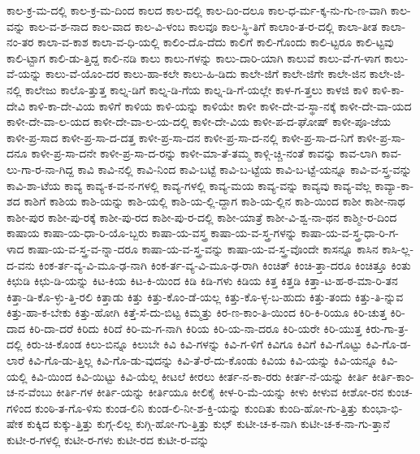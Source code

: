 {ಕಾಲ-ಕ್ರ-ಮ-ದಲ್ಲಿ
ಕಾಲ-ಕ್ರ-ಮ-ದಿಂದ
ಕಾಲದ
ಕಾಲ-ದಲ್ಲಿ
ಕಾಲ-ದಿಂ-ದಲೂ
ಕಾಲ-ಧ-ರ್ಮ-ಕ್ಕ-ನು-ಗು-ಣ-ವಾಗಿ
ಕಾಲ-ವನ್ನು
ಕಾಲ-ವ-ಶ-ನಾದ
ಕಾಲ-ವಾದ
ಕಾಲ-ವಿ-ಳಂಬ
ಕಾಲವೂ
ಕಾಲ-ಸ್ಥಿ-ತಿಗೆ
ಕಾಲಾಂ-ತ-ರ-ದಲ್ಲಿ
ಕಾಲಾ-ತೀತ
ಕಾಲಾ-ನಂ-ತರ
ಕಾಲಾ-ವ-ಕಾಶ
ಕಾಲಾ-ವ-ಧಿ-ಯಲ್ಲಿ
ಕಾಲಿಂ-ದೊ-ದೆದು
ಕಾಲಿಗೆ
ಕಾಲಿ-ಗೊಂದು
ಕಾಲಿ-ಟ್ಟರೂ
ಕಾಲಿ-ಟ್ಟವು
ಕಾಲಿ-ಟ್ಟಾಗ
ಕಾಲಿ-ಡು-ತ್ತಿದ್ದ
ಕಾಲಿ-ನಡಿ
ಕಾಲು
ಕಾಲು-ಗಳನ್ನು
ಕಾಲು-ದಾರಿ-ಯಾಗಿ
ಕಾಲುವೆ
ಕಾಲು-ವೆ-ಗ-ಳಾಗ
ಕಾಲು-ವೆ-ಯನ್ನು
ಕಾಲು-ವೆ-ಯೊಂ-ದರ
ಕಾಲು-ಹಾ-ಕಲೇ
ಕಾಲು-ಹಿ-ಡಿದು
ಕಾಲೇ-ಜಿಗೆ
ಕಾಲೇ-ಜಿಗೇ
ಕಾಲೇ-ಜಿನ
ಕಾಲೇ-ಜಿ-ನಲ್ಲಿ
ಕಾಲೇಜು
ಕಾಲೊ-ತ್ತುತ್ತ
ಕಾಲ್ನ-ಡಿಗೆ
ಕಾಲ್ನ-ಡಿ-ಗೆಯ
ಕಾಲ್ನ-ಡಿ-ಗೆ-ಯಲ್ಲೇ
ಕಾಳ-ಗ-ತ್ತಲು
ಕಾಳಜಿ
ಕಾಳಿ
ಕಾಳಿ-ಕಾ-ದೇವಿ
ಕಾಳಿ-ಕಾ-ದೇ-ವಿಯ
ಕಾಳಿಗೆ
ಕಾಳಿಯ
ಕಾಳಿ-ಯನ್ನು
ಕಾಳಿಯೇ
ಕಾಳೀ
ಕಾಳೀ-ದೇ-ವ-ಸ್ಥಾ-ನಕ್ಕೆ
ಕಾಳೀ-ದೇ-ವಾ-ಯದ
ಕಾಳೀ-ದೇ-ವಾ-ಲ-ಯದ
ಕಾಳೀ-ದೇ-ವಾ-ಲ-ಯ-ದಲ್ಲಿ
ಕಾಳೀ-ದೇ-ವಿಯ
ಕಾಳೀ-ಪ-ದ-ಘೋಷ್
ಕಾಳೀ-ಪೂ-ಜೆಯ
ಕಾಳೀ-ಪ್ರ-ಸಾದ
ಕಾಳೀ-ಪ್ರ-ಸಾ-ದ-ದತ್ತ
ಕಾಳೀ-ಪ್ರ-ಸಾ-ದನ
ಕಾಳೀ-ಪ್ರ-ಸಾ-ದ-ನಲ್ಲಿ
ಕಾಳೀ-ಪ್ರ-ಸಾ-ದ-ನಿಗೆ
ಕಾಳೀ-ಪ್ರ-ಸಾ-ದನೂ
ಕಾಳೀ-ಪ್ರ-ಸಾ-ದನೇ
ಕಾಳೀ-ಪ್ರ-ಸಾ-ದ-ರನ್ನು
ಕಾಳೀ-ಮಾ-ತೆ-ತಮ್ಮ
ಕಾಳ್ಗಿ-ಚ್ಚಿ-ನಂತೆ
ಕಾವನ್ನು
ಕಾವ-ಲಾಗಿ
ಕಾವ-ಲು-ಗಾ-ರ-ನಾ-ಗಿದ್ದ
ಕಾವಿ
ಕಾವಿ-ನಲ್ಲಿ
ಕಾವಿ-ನಿಂದ
ಕಾವಿ-ಬಟ್ಟೆ
ಕಾವಿ-ಬ-ಟ್ಟೆಯ
ಕಾವಿ-ಬ-ಟ್ಟೆ-ಯನ್ನೂ
ಕಾವಿ-ವ-ಸ್ತ್ರ-ವನ್ನು
ಕಾವಿ-ಶಾ-ಟೆಯ
ಕಾವ್ಯ
ಕಾವ್ಯ-ಕ-ವ-ನ-ಗಳಲ್ಲಿ
ಕಾವ್ಯ-ಗಳಲ್ಲಿ
ಕಾವ್ಯ-ಮಯ
ಕಾವ್ಯ-ವನ್ನು
ಕಾವ್ಯವು
ಕಾವ್ಯ-ವೆಲ್ಲ
ಕಾವ್ಯಾ-ಕಾ-ಶದ
ಕಾಶಿಗೆ
ಕಾಶಿಯ
ಕಾಶಿ-ಯನ್ನು
ಕಾಶಿ-ಯಲ್ಲಿ
ಕಾಶಿ-ಯ-ಲ್ಲಿ-ದ್ದಾಗ
ಕಾಶಿ-ಯ-ಲ್ಲಿನ
ಕಾಶಿ-ಯಿಂದ
ಕಾಶೀ
ಕಾಶೀ-ನಾಥ
ಕಾಶೀ-ಪುರ
ಕಾಶೀ-ಪು-ರಕ್ಕೆ
ಕಾಶೀ-ಪು-ರದ
ಕಾಶೀ-ಪು-ರ-ದಲ್ಲಿ
ಕಾಶೀ-ಯಾತ್ರೆ
ಕಾಶೀ-ವಿ-ಶ್ವ-ನಾ-ಥನ
ಕಾಶ್ಮೀ-ರ-ದಿಂದ
ಕಾಷಾಯ
ಕಾಷಾ-ಯ-ಧಾ-ರಿ-ಯೊ-ಬ್ಬರು
ಕಾಷಾ-ಯ-ವಸ್ತ್ರ
ಕಾಷಾ-ಯ-ವ-ಸ್ತ್ರ-ಗಳನ್ನು
ಕಾಷಾ-ಯ-ವ-ಸ್ತ್ರ-ಧಾ-ರಿ-ಗ-ಳಾದ
ಕಾಷಾ-ಯ-ವ-ಸ್ತ್ರ-ವ-ನ್ನಾ-ದರೂ
ಕಾಷಾ-ಯ-ವ-ಸ್ತ್ರ-ವನ್ನು
ಕಾಷಾ-ಯ-ವ-ಸ್ತ್ರ-ವೊಂದೇ
ಕಾಸನ್ನೂ
ಕಾಸಿನ
ಕಾಸಿ-ಲ್ಲ-ದ-ವನು
ಕಿಂಕ-ರ್ತ-ವ್ಯ-ವಿ-ಮೂ-ಢ-ನಾಗಿ
ಕಿಂಕ-ರ್ತ-ವ್ಯ-ವಿ-ಮೂ-ಢ-ರಾಗಿ
ಕಿಂಚಿತ್
ಕಿಂಚಿ-ತ್ತಾ-ದರೂ
ಕಿಂಚಿತ್ತೂ
ಕಿಂತು
ಕಿಛುಡಿ
ಕಿಛು-ಡಿ-ಯನ್ನು
ಕಿಟ-ಕಿಯ
ಕಿಟ-ಕಿ-ಯಿಂದ
ಕಿಡಿ
ಕಿಡಿ-ಗಳು
ಕಿಡಿಯ
ಕಿತ್ತ
ಕಿತ್ತಡಿ
ಕಿತ್ತಾ-ಟ-ಹ-ಠ-ಮಾ-ರಿ-ತನ
ಕಿತ್ತಾ-ಡಿ-ಕೊ-ಳ್ಳು-ತ್ತಿ-ರಲಿ
ಕಿತ್ತಾಡು
ಕಿತ್ತು
ಕಿತ್ತು-ಕೊಂ-ಡೆ-ಯಲ್ಲ
ಕಿತ್ತು-ಕೊ-ಳ್ಳ-ಬ-ಹುದು
ಕಿತ್ತು-ತಂದು
ಕಿತ್ತು-ತಿ-ನ್ನುವ
ಕಿತ್ತು-ಹಾ-ಕ-ಬೇಕು
ಕಿತ್ತು-ಹೋಗಿ
ಕಿತ್ತೆ-ಸೆ-ದು-ಬಿಟ್ಟ
ಕಿಮ್ಮತ್ತು
ಕಿರ-ಣ-ಕಾಂ-ತಿ-ಯಿಂದ
ಕಿರಿ-ಕಿ-ರಿಯೂ
ಕಿರಿ-ಚುತ್ತ
ಕಿರಿ-ದಾದ
ಕಿರಿ-ದಾ-ದರೆ
ಕಿರಿದು
ಕಿರಿದೆ
ಕಿರಿ-ಮ-ಗ-ನಾಗಿ
ಕಿರಿಯ
ಕಿರಿ-ಯ-ನಾ-ದರೂ
ಕಿರಿ-ಯರೇ
ಕಿರಿ-ಯುತ್ತ
ಕಿರು-ಗಾ-ತ್ರ-ದಲ್ಲಿ
ಕಿರು-ಚಿ-ಕೊಂಡ
ಕಿಲು-ಬಿನ್ನೂ
ಕಿಲುಬೇ
ಕಿವಿ
ಕಿವಿ-ಗಳನ್ನು
ಕಿವಿ-ಗ-ಳಿಗೆ
ಕಿವಿಗೂ
ಕಿವಿಗೆ
ಕಿವಿ-ಗೊಟ್ಟು
ಕಿವಿ-ಗೊ-ಡ-ಲಾರೆ
ಕಿವಿ-ಗೊ-ಡು-ತ್ತಿಲ್ಲ
ಕಿವಿ-ಗೊ-ಡು-ವುದನ್ನು
ಕಿವಿ-ತೆ-ರೆ-ದು-ಕೊಂಡು
ಕಿವಿಯ
ಕಿವಿ-ಯನ್ನು
ಕಿವಿ-ಯನ್ನೂ
ಕಿವಿ-ಯಲ್ಲಿ
ಕಿವಿ-ಯಿಂದ
ಕಿವಿ-ಯಿಟ್ಟು
ಕಿವಿ-ಯೆಲ್ಲ
ಕೀಟಲೆ
ಕೀರಲು
ಕೀರ್ತ-ನ-ಕಾ-ರರು
ಕೀರ್ತ-ನೆ-ಯನ್ನು
ಕೀರ್ತಿ
ಕೀರ್ತಿ-ಕಾಂ-ಚ-ನ-ವೆಂಬು
ಕೀರ್ತಿ-ಗಳ
ಕೀರ್ತಿ-ಯನ್ನು
ಕೀರ್ತಿಯೂ
ಕೀಲಿಕೈ
ಕೀಳ-ರಿ-ಮೆ-ಯನ್ನು
ಕೀಳು
ಕೀಳುವ
ಕೀಶೋ-ರನ
ಕುಂಚ-ಗಳಿಂದ
ಕುಂಠಿ-ತ-ಗೊ-ಳಿಸು
ಕುಂಡ-ಲಿನಿ
ಕುಂಡ-ಲಿ-ನೀ-ಶ-ಕ್ತಿ-ಯನ್ನು
ಕುಂದಿತು
ಕುಂದಿ-ಹೋ-ಗು-ತ್ತಿತ್ತು
ಕುಂಭಾ-ಭಿ-ಷೇಕ
ಕುಕ್ಕಿದ
ಕುಕ್ಕು-ತ್ತಿತ್ತು
ಕುಗ್ಗ-ಲಿಲ್ಲ
ಕುಗ್ಗಿ-ಹೋ-ಗು-ತ್ತಿತ್ತು
ಕುಛ್
ಕುಟೀ-ಚ-ಕ-ನಾಗಿ
ಕುಟೀ-ಚ-ಕ-ನಾ-ಗು-ತ್ತಾನೆ
ಕುಟೀ-ರ-ಗಳಲ್ಲಿ
ಕುಟೀ-ರ-ಗಳು
ಕುಟೀ-ರದ
ಕುಟೀ-ರ-ವನ್ನು
}
